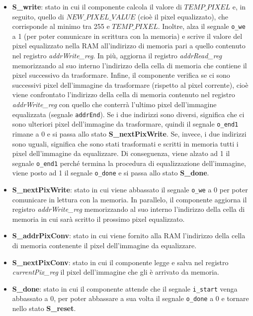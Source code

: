 \documentclass{article}
\begin{document}
\begin{itemize}
	\item \textbf{S\_write}: stato in cui il componente calcola il valore di $TEMP\_PIXEL$ e, in seguito, quello di $NEW\_PIXEL\_VALUE$ (cioè il pixel equalizzato), che corrisponde al minimo tra 255 e $TEMP\_PIXEL$. Inoltre, alza il segnale \verb^o_we^ a 1 (per poter comunicare in scrittura con la memoria) e scrive il valore del pixel equalizzato nella RAM all'indirizzo di memoria pari a quello contenuto nel registro \textit{addrWrite\_reg}. In più, aggiorna il registro \textit{addrRead\_reg} memorizzando al suo interno l'indirizzo della cella di memoria che contiene il pixel successivo da trasformare. Infine, il componente verifica se ci sono successivi pixel dell'immagine da trasformare (rispetto al pixel corrente), cioè viene confrontato l'indirizzo della cella di memoria contenuto nel registro \textit{addrWrite\_reg} con quello che conterrà l'ultimo pixel dell'immagine equalizzata (segnale \verb^addrEnd^). Se i due indirizzi sono diversi, significa che ci sono ulteriori pixel dell'immagine da trasformare, quindi il segnale \verb^o_end1^ rimane a 0 e si passa allo stato \textbf{S\_nextPixWrite}. Se, invece, i due indirizzi sono uguali, significa che sono stati trasformati e scritti in memoria tutti i pixel dell'immagine da equalizzare. Di conseguenza, viene alzato ad 1 il segnale \verb^o_end1^ perché termina la procedura di equalizzazione dell'immagine, viene posto ad 1 il segnale \verb^o_done^ e si passa allo stato \textbf{S\_done}.
	\item \textbf{S\_nextPixWrite}: stato in cui viene abbassato il segnale \verb^o_we^ a 0 per poter comunicare in lettura con la memoria. In parallelo, il componente aggiorna il registro \textit{addrWrite\_reg} memorizzando al suo interno l'indirizzo della cella di memoria in cui sarà scritto il prossimo pixel equalizzato.
	\item \textbf{S\_addrPixConv}: stato in cui viene fornito alla RAM l'indirizzo della cella di memoria contenente il pixel dell'immagine da equalizzare.
	\item \textbf{S\_nextPixConv}: stato in cui il componente legge e salva nel registro \textit{currentPix\_reg} il pixel dell'immagine che gli è arrivato da memoria.
	\item \textbf{S\_done}: stato in cui il componente attende che il segnale \verb^i_start^ venga abbassato a 0, per poter abbassare a sua volta il segnale \verb^o_done^ a 0 e tornare nello stato \textbf{S\_reset}.
\end{itemize}
\end{document}
